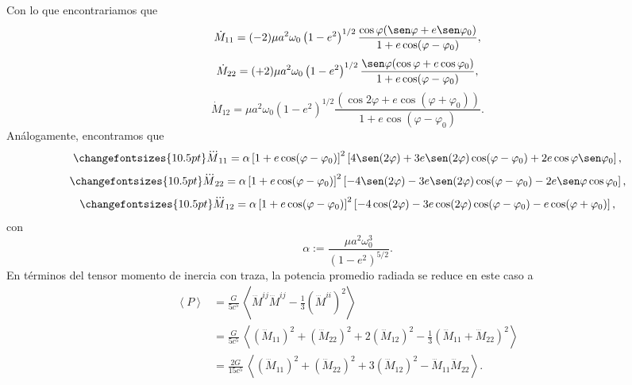 Con lo que encontrariamos que 
\begin{equation*}
\dot{M}_{11}=(-2)\mu a^2\omega_0\left(1-e^2\right)^{1/2}\frac{\cos\varphi(\sen\varphi+e\sen\varphi_0)}{1+e\cos(\varphi-\varphi_0)},
\end{equation*}
\begin{equation*}
\dot{M}_{22}=(+2)\mu a^2\omega_0\left(1-e^2\right)^{1/2}\frac{\sen\varphi(\cos\varphi+e\cos\varphi_0)}{1+e\cos(\varphi-\varphi_0)},
\end{equation*}
\begin{equation*}
    \dot{M}_{12}=\mu a^2\omega_0\left(1-e^2\right)^{1/2}\frac{(\cos2\varphi+e\cos(\varphi+\varphi_0))}{1+e\cos(\varphi-\varphi_0)}.
\end{equation*}
Análogamente, encontramos que
\begin{equation}\label{eq:I11}
    \changefontsizes{10.5pt}
\dddot{M}_{11}=\alpha\left[1+e\cos(\varphi-\varphi_0)\right]^2 \left[4\sen(2\varphi)+3e\sen(2\varphi)\cos(\varphi-\varphi_0)
+2e\cos\varphi\sen\varphi_0\right],
\end{equation}
\begin{equation}\label{eq:I22}
    \changefontsizes{10.5pt}
\dddot{M}_{22}=\alpha\left[1+e\cos(\varphi-\varphi_0)\right]^2 \left[-4\sen(2\varphi)-3e\sen(2\varphi)\cos(\varphi-\varphi_0)
-2e\sen\varphi\cos\varphi_0\right],
\end{equation}
\begin{equation}\label{eq:I12}
    \changefontsizes{10.5pt}
\dddot{M}_{12}=\alpha\left[1+e\cos(\varphi-\varphi_0)\right]^2 \left[-4\cos(2\varphi)-3e\cos(2\varphi)\cos(\varphi-\varphi_0)
-e\cos(\varphi+\varphi_0)\right],
\end{equation}
con
\begin{equation*}
\alpha:=\frac{\mu a^2\omega_0^3}{\left(1-e^2\right)^{5/2}}.
\end{equation*}
En términos del tensor momento de inercia con traza, la potencia promedio radiada se reduce en este caso a
\begin{align*}
\left\langle P\right\rangle &=\frac{G}{5c^5}\, \left\langle \dddot{M}^{ij}\dddot{M}^{ij}-\frac{1}{3}\left(\dddot{M}^{ii}\right)^2\right\rangle \\
&=\frac{G}{5c^5}\, \left\langle \left(\dddot{M}_{11}\right)^2+ \left(\dddot{M}_{22}\right)^2+2 \left(\dddot{M}_{12}\right)^2-\frac{1}{3}\left(\dddot{M}_{11}+\dddot{M}_{22}\right)^2\right\rangle \\
&=\frac{2G}{15c^5}\, \left\langle \left(\dddot{M}_{11}\right)^2+ \left(\dddot{M}_{22}\right)^2+3\left(\dddot{M}_{12}\right)^2 -\dddot{M}_{11}\dddot{M}_{22}\right\rangle .
\end{align*}
